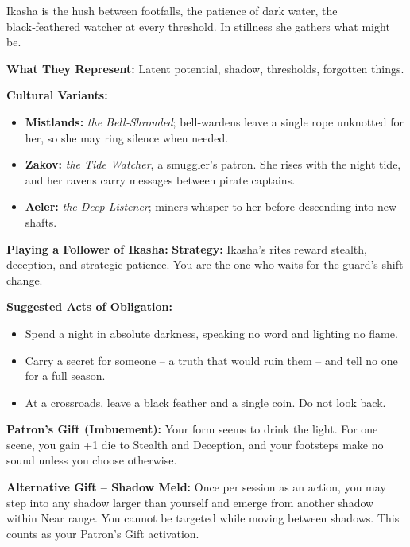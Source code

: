\documentclass[10pt,a5paper]{book}
\begin{document}
Ikasha is the hush between footfalls, the patience of dark water, the black‑feathered watcher at every threshold. In stillness she gathers what might be.

\textbf{What They Represent:} Latent potential, shadow, thresholds, forgotten things.

\textbf{Cultural Variants:}
\begin{itemize}
    \item \textbf{Mistlands:} \textit{the Bell‑Shrouded}; bell‑wardens leave a single rope unknotted for her, so she may ring silence when needed.
    \item \textbf{Zakov:} \textit{the Tide Watcher}, a smuggler's patron. She rises with the night tide, and her ravens carry messages between pirate captains.
    \item \textbf{Aeler:} \textit{the Deep Listener}; miners whisper to her before descending into new shafts.
\end{itemize}

\textbf{Playing a Follower of Ikasha:}
\textbf{Strategy:} Ikasha's rites reward stealth, deception, and strategic patience. You are the one who waits for the guard's shift change.

\textbf{Suggested Acts of Obligation:}
\begin{itemize}
    \item Spend a night in absolute darkness, speaking no word and lighting no flame.
    \item Carry a secret for someone -- a truth that would ruin them -- and tell no one for a full season.
    \item At a crossroads, leave a black feather and a single coin. Do not look back.
\end{itemize}

\textbf{Patron's Gift (Imbuement):} Your form seems to drink the light. For one scene, you gain +1 die to Stealth and Deception, and your footsteps make no sound unless you choose otherwise.

\textbf{Alternative Gift -- Shadow Meld:} Once per session as an action, you may step into any shadow larger than yourself and emerge from another shadow within Near range. You cannot be targeted while moving between shadows. This counts as your Patron's Gift activation.
\end{document}
